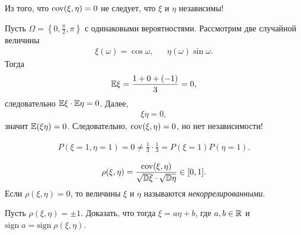 \documentclass[../main.tex]{subfiles}
\begin{document}
\begin{remrk}
 Из того, что $ \mathrm{cov}(\xi,\eta) = 0 $ не следует, что $ \xi $ и $ \eta $ независимы!
\end{remrk}
\begin{exmpl}
 Пусть $ \Omega = \left\{ 0,\frac{\pi}{2},\pi \right\} $ с одинаковыми вероятностями. Рассмотрим две случайной величины
 \begin{align*}
  \xi(\omega) = \cos \omega, & &\eta(\omega) \sin \omega.
 \end{align*} Тогда
 \begin{align*}
  \mathbb E\xi = \frac{1 + 0 + (-1)}{3} = 0,
 \end{align*} следовательно $ \mathbb E\xi \cdot \mathbb E\eta = 0 $. Далее,
 \begin{align*}
  \xi\eta = 0, 
 \end{align*} значит $ \mathbb E(\xi\eta) = 0 $. Следовательно, $ \mathrm{cov}(\xi,\eta) = 0 $, но нет независимости!
 
\begin{align*}
 P(\xi = 1,\eta =1) = 0 \neq \frac{1}{3} \cdot \frac{1}{3} = P(\xi = 1) P(\eta = 1).
\end{align*}
\end{exmpl}

\begin{df}
 
\begin{align*}
 \rho(\xi,\eta) = \frac{\mathrm{cov}(\xi,\eta)}{\sqrt{\mathbb D\xi} \cdot \sqrt{\mathbb D\eta}} \in [0,1].
\end{align*} Если $ \rho(\xi,\eta) = 0 $, то величины $ \xi $ и $ \eta $ называются \textit{некоррелированными}.

\end{df}

\begin{exercs*}
 Пусть $ \rho(\xi,\eta) = \pm 1 $. Доказать, что тогда $ \xi = a\eta + b $, где $ a, b \in \mathbb{R} $ и $ \mathrm{sign}\;a = \mathrm{sign}\;\rho(\xi,\eta) $.
\end{exercs*}
\end{document}
